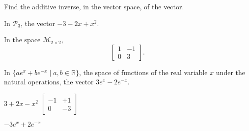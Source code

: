 

\begin{Exercise}[
name={},
title={}, 
difficulty=0,
origin={by Jim Hefferon \cite{JH}}]
Find the additive inverse, in the vector space, of the vector.

\Question
In \( \mathcal{P}_3 \), the vector \( -3-2x+x^2 \).

\Question
In the space \( \mathcal{M}_{2\times 2} \),
        \begin{equation*}
          \begin{bmatrix}
            1  &-1  \\
            0  &3
          \end{bmatrix}.
        \end{equation*}

\Question
In \( \{ae^x+be^{-x}\;|\; a,b\in\mathbb{R}\} \), the space 
       of functions of the real variable \( x \) under the natural operations,
       the vector \( 3e^x-2e^{-x} \).
\end{Exercise}

\begin{Answer}
\Question \( 3+2x-x^2 \)
\Question \( \begin{bmatrix}
                   -1  &+1  \\
                    0  &-3
                 \end{bmatrix} \)

\Question \( -3e^x+2e^{-x} \)
\end{Answer}
